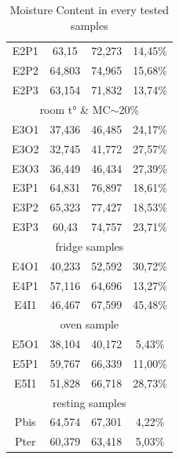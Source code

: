 \begin{table}[th]
\begin{tabular}{cccc}
		\multicolumn{1}{c}{E2P1} & \multicolumn{1}{c}{63,15} & \multicolumn{1}{c}{72,273} & \multicolumn{1}{c}{14,45\%} \\ 
		\multicolumn{1}{c}{E2P2} & \multicolumn{1}{c}{64,803} & \multicolumn{1}{c}{74,965} & \multicolumn{1}{c}{15,68\%} \\ 
		\multicolumn{1}{c}{E2P3} & \multicolumn{1}{c}{63,154} & \multicolumn{1}{c}{71,832} & \multicolumn{1}{c}{13,74\%} \\ 
		\multicolumn{4}{c}{\cellcolor[HTML]{F4B084}room t° \& MC$\sim$20\%} \\ 
		\multicolumn{1}{c}{E3O1} & \multicolumn{1}{c}{37,436} & \multicolumn{1}{c}{46,485} & \multicolumn{1}{c}{24,17\%} \\ 
		\multicolumn{1}{c}{E3O2} & \multicolumn{1}{c}{32,745} & \multicolumn{1}{c}{41,772} & \multicolumn{1}{c}{27,57\%} \\ 
		\multicolumn{1}{c}{E3O3} & \multicolumn{1}{c}{36,449} & \multicolumn{1}{c}{46,434} & \multicolumn{1}{c}{27,39\%} \\ 
		\multicolumn{1}{c}{E3P1} & \multicolumn{1}{c}{64,831} & \multicolumn{1}{c}{76,897} & \multicolumn{1}{c}{18,61\%} \\ 
		\multicolumn{1}{c}{E3P2} & \multicolumn{1}{c}{65,323} & \multicolumn{1}{c}{77,427} & \multicolumn{1}{c}{18,53\%} \\ 
		\multicolumn{1}{c}{E3P3} & \multicolumn{1}{c}{60,43} & \multicolumn{1}{c}{74,757} & \multicolumn{1}{c}{23,71\%} \\ 
		\multicolumn{4}{c}{\cellcolor[HTML]{F4B084}fridge samples} \\ 
		\multicolumn{1}{c}{E4O1} & \multicolumn{1}{c}{40,233} & \multicolumn{1}{c}{52,592} & \multicolumn{1}{c}{30,72\%} \\ 
		\multicolumn{1}{c}{E4P1} & \multicolumn{1}{c}{57,116} & \multicolumn{1}{c}{64,696} & \multicolumn{1}{c}{13,27\%} \\ 
		\multicolumn{1}{c}{E4I1} & \multicolumn{1}{c}{46,467} & \multicolumn{1}{c}{67,599} & \multicolumn{1}{c}{45,48\%} \\ 
		\multicolumn{4}{c}{\cellcolor[HTML]{F4B084}oven sample} \\ 
		\multicolumn{1}{c}{E5O1} & \multicolumn{1}{c}{38,104} & \multicolumn{1}{c}{40,172} & \multicolumn{1}{c}{5,43\%} \\ 
		\multicolumn{1}{c}{E5P1} & \multicolumn{1}{c}{59,767} & \multicolumn{1}{c}{66,339} & \multicolumn{1}{c}{11,00\%} \\ 
		\multicolumn{1}{c}{E5I1} & \multicolumn{1}{c}{51,828} & \multicolumn{1}{c}{66,718} & \multicolumn{1}{c}{28,73\%} \\ 
		\multicolumn{4}{c}{\cellcolor[HTML]{F4B084}resting samples} \\ 
		\multicolumn{1}{c}{Pbis} & \multicolumn{1}{c}{64,574} & \multicolumn{1}{c}{67,301} & \multicolumn{1}{c}{4,22\%} \\ 
		\multicolumn{1}{c}{Pter} & \multicolumn{1}{c}{60,379} & \multicolumn{1}{c}{63,418} & \multicolumn{1}{c}{5,03\%} \\ \hline
	\end{tabular}
	\caption{Moisture Content in every tested samples}
	\label{tab:LastMC}
\end{table}
